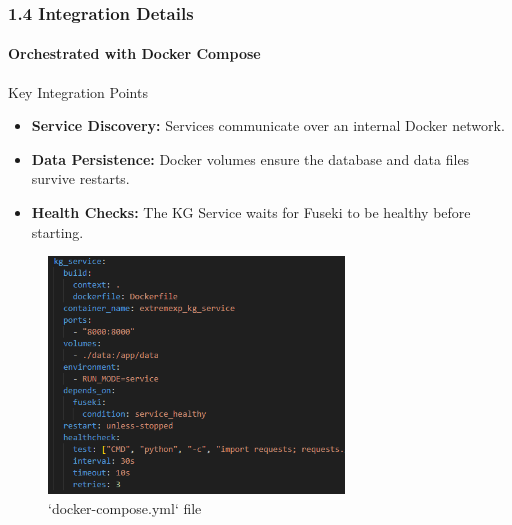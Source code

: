 \documentclass{beamer}
\begin{document}
\begin{frame}[fragile]
    \frametitle{1.4 Integration Details}
    \framesubtitle{Orchestrated with Docker Compose}
    
    \begin{block}{Key Integration Points}
        \begin{itemize}
            \item \textbf{Service Discovery:} Services communicate over an internal Docker network.
            \item \textbf{Data Persistence:} Docker volumes ensure the database and data files survive restarts.
            \item \textbf{Health Checks:} The KG Service waits for Fuseki to be healthy before starting.
        \end{itemize}
    \end{block}
    
    \begin{figure}
        \includegraphics[width=0.7\textwidth]{dc.png}
        \caption{`docker-compose.yml` file}
    \end{figure}
    
\end{frame}
\end{document}
